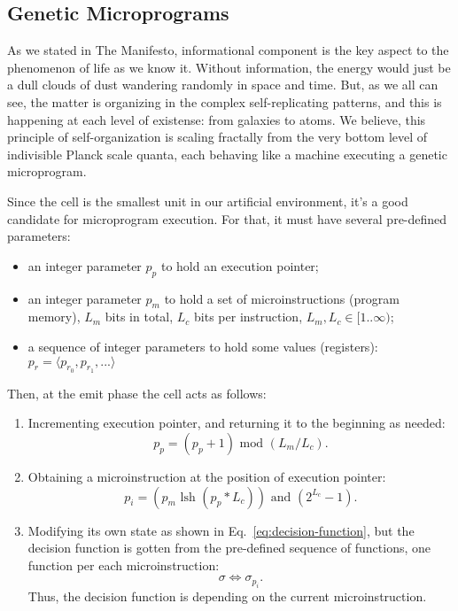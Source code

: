 \documentclass[a4paper,12pt,tikz,UTF8]{article}
\begin{document}
  \subsection{Genetic Microprograms}

    As we stated in The Manifesto, informational component is the key aspect to the phenomenon of life as we know it. Without information, the energy would just be a dull clouds of dust wandering randomly in space and time. But, as we all can see, the matter is organizing in the complex self-replicating patterns, and this is happening at each level of existense: from galaxies to atoms. We believe, this principle of self-organization is scaling fractally from the very bottom level of indivisible Planck scale quanta, each behaving like a machine executing a genetic microprogram.

    Since the cell is the smallest unit in our artificial environment, it's a good candidate for microprogram execution. For that, it must have several pre-defined parameters:
    \begin{itemize}
      \item an integer parameter $p_p$ to hold an execution pointer;
      \item an integer parameter $p_m$ to hold a set of microinstructions (program memory), $L_m$ bits in total, $L_c$ bits per instruction, $L_m, L_c \in {[1 .. \infty)}$;
      \item a sequence of integer parameters to hold some values (registers): $p_r = \langle p_{r_0}, p_{r_1}, ... \rangle$ 
    \end{itemize}

    Then, at the emit phase the cell acts as follows:
    \begin{enumerate}
      \item Incrementing execution pointer, and returning it to the beginning as needed:
        \begin{equation}
          p_p = (p_p + 1) \text{ mod } (L_m / L_c).
        \end{equation}
      \item Obtaining a microinstruction at the position of execution pointer:
        \begin{equation}
          p_i = (p_m \text{ lsh } (p_p * L_c)) \text{ and } (2^{L_c} - 1).
        \end{equation}
      \item Modifying its own state as shown in Eq.~\ref{eq:decision-function}, but the decision function is gotten from the pre-defined sequence of functions, one function per each microinstruction:
        \begin{equation}
          \sigma \Leftrightarrow \sigma_{p_i}.
        \end{equation}
        Thus, the decision function is depending on the current microinstruction.
    \end{enumerate}
\end{document}

